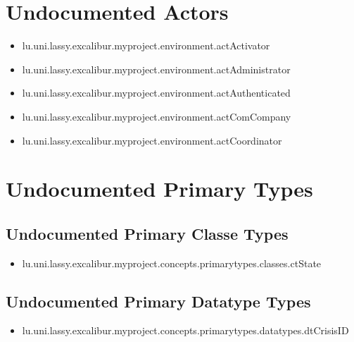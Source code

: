 \section[Undocumented Actors]{Undocumented Actors}
\begin{itemize}
\item lu.uni.lassy.excalibur.myproject.environment.actActivator 
\item lu.uni.lassy.excalibur.myproject.environment.actAdministrator 
\item lu.uni.lassy.excalibur.myproject.environment.actAuthenticated 
\item lu.uni.lassy.excalibur.myproject.environment.actComCompany 
\item lu.uni.lassy.excalibur.myproject.environment.actCoordinator 
\end{itemize}




\section[Undocumented Primary Types]{Undocumented Primary Types}

\subsection[Undocumented Primary Classe Types]{Undocumented Primary Classe Types}
\begin{itemize}
\item lu.uni.lassy.excalibur.myproject.concepts.primarytypes.classes.ctState 
\end{itemize}

\subsection[Undocumented Primary Datatype Types]{Undocumented Primary Datatype Types}
\begin{itemize}
\item lu.uni.lassy.excalibur.myproject.concepts.primarytypes.datatypes.dtCrisisID 
\end{itemize}
























